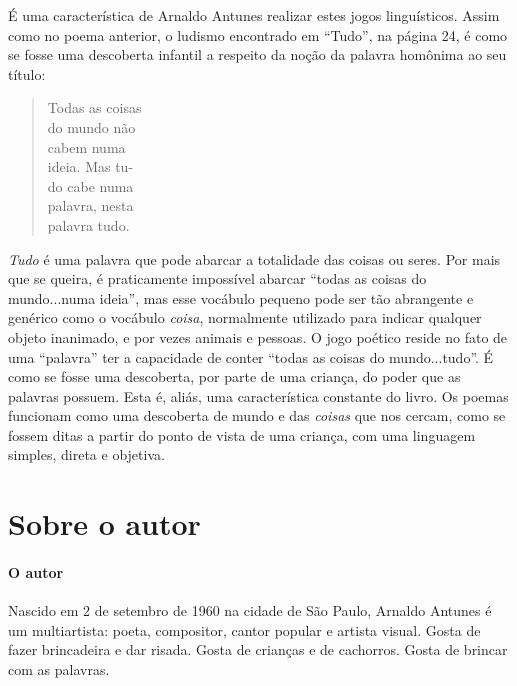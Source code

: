 \documentclass[11pt]{extarticle}
\begin{document}
É uma característica de Arnaldo Antunes realizar estes jogos linguísticos. 
Assim como no
poema anterior, o ludismo encontrado em ``Tudo'', na página 24, é como se fosse uma
descoberta infantil a respeito da noção da palavra homônima ao seu título:

\begin{verse}
Todas as coisas\\
do mundo não\\
cabem numa\\
ideia. Mas tu-\\
do cabe numa\\
palavra, nesta\\
palavra tudo.\\
\end{verse}

\textit{Tudo} é uma palavra que pode abarcar a totalidade das coisas ou seres. Por mais
que se queira, é praticamente impossível abarcar ``todas as coisas do mundo...numa ideia'',
mas esse vocábulo pequeno pode ser tão abrangente e genérico como o vocábulo \textit{coisa},
normalmente utilizado para indicar qualquer objeto inanimado, e por vezes animais e pessoas. 
O jogo poético reside no fato de uma ``palavra'' ter a capacidade de conter ``todas
as coisas do mundo...tudo''. É como se fosse uma descoberta, por parte de uma criança, do
poder que as palavras possuem. Esta é, aliás, uma característica constante do livro. Os
poemas funcionam como uma descoberta de mundo e das \textit{coisas} que nos cercam, como
se fossem ditas a partir do ponto de vista de uma criança, com uma linguagem simples,
direta e objetiva.


\reversemarginpar
\marginparwidth=5cm



\section{Sobre o autor}


\paragraph{O autor}


Nascido em 2 de setembro de 1960 na cidade de São Paulo, Arnaldo Antunes é um multiartista: 
poeta, compositor, cantor popular e artista visual.
Gosta de fazer brincadeira e dar risada. Gosta de crianças e de cachorros.
Gosta de brincar com as palavras.
\end{document}
